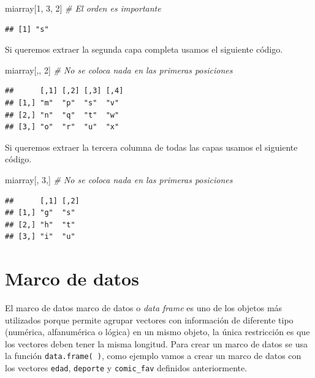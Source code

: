 \documentclass[
]{book}
\makeatletter
\newenvironment{Shaded}{\begin{snugshade}}{\end{snugshade}}
\newcommand{\CommentTok}[1]{\textcolor[rgb]{0.56,0.35,0.01}{\textit{#1}}}
\newcommand{\DecValTok}[1]{\textcolor[rgb]{0.00,0.00,0.81}{#1}}
\newcommand{\NormalTok}[1]{#1}
\newenvironment{kframe}{%
\medskip{}
\setlength{\fboxsep}{.8em}
 \def\at@end@of@kframe{}%
 \ifinner\ifhmode%
  \def\at@end@of@kframe{\end{minipage}}%
  \begin{minipage}{\columnwidth}%
 \fi\fi%
 \def\FrameCommand##1{\hskip\@totalleftmargin \hskip-\fboxsep
 \colorbox{shadecolor}{##1}\hskip-\fboxsep
     \hskip-\linewidth \hskip-\@totalleftmargin \hskip\columnwidth}%
 \MakeFramed {\advance\hsize-\width
   \@totalleftmargin\z@ \linewidth\hsize
   \@setminipage}}%
 {\par\unskip\endMakeFramed%
 \at@end@of@kframe}
\renewenvironment{Shaded}{\begin{kframe}}{\end{kframe}}
\makeatother
\begin{document}
\begin{Shaded}
\begin{Highlighting}[]
\NormalTok{miarray[}\DecValTok{1}\NormalTok{, }\DecValTok{3}\NormalTok{, }\DecValTok{2}\NormalTok{]  }\CommentTok{\# El orden es importante}
\end{Highlighting}
\end{Shaded}

\begin{verbatim}
## [1] "s"
\end{verbatim}

Si queremos extraer la segunda capa completa usamos el siguiente código.

\begin{Shaded}
\begin{Highlighting}[]
\NormalTok{miarray[,, }\DecValTok{2}\NormalTok{]  }\CommentTok{\# No se coloca nada en las primeras posiciones}
\end{Highlighting}
\end{Shaded}

\begin{verbatim}
##      [,1] [,2] [,3] [,4]
## [1,] "m"  "p"  "s"  "v" 
## [2,] "n"  "q"  "t"  "w" 
## [3,] "o"  "r"  "u"  "x"
\end{verbatim}

Si queremos extraer la tercera columna de todas las capas usamos el siguiente código.

\begin{Shaded}
\begin{Highlighting}[]
\NormalTok{miarray[, }\DecValTok{3}\NormalTok{,]  }\CommentTok{\# No se coloca nada en las primeras posiciones}
\end{Highlighting}
\end{Shaded}

\begin{verbatim}
##      [,1] [,2]
## [1,] "g"  "s" 
## [2,] "h"  "t" 
## [3,] "i"  "u"
\end{verbatim}

\hypertarget{marco-de-datos}{%
\section{\texorpdfstring{Marco de datos  }{Marco de datos  }}\label{marco-de-datos}}

El marco de datos marco de datos o \emph{data frame} es uno de los objetos más utilizados porque permite agrupar vectores con información de diferente tipo (numérica, alfanumérica o lógica) en un mismo objeto, la única restricción es que los vectores deben tener la misma longitud. Para crear un marco de datos se usa la función \texttt{data.frame(\ )}, como ejemplo vamos a crear un marco de datos con los vectores \texttt{edad}, \texttt{deporte} y \texttt{comic\_fav} definidos anteriormente.
\end{document}
